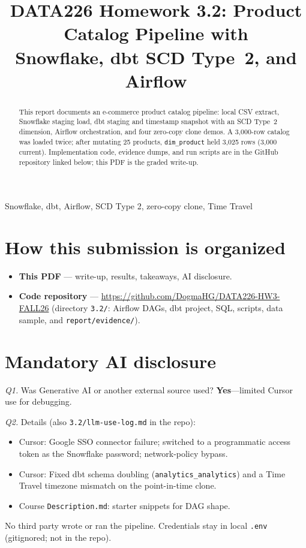 \documentclass[conference]{IEEEtran}
\begin{document}
\title{DATA226 Homework 3.2: Product Catalog Pipeline with\\
Snowflake, dbt SCD Type~2, and Airflow}

\author{
}

\maketitle

\begin{abstract}
This report documents an e-commerce product catalog pipeline:
local CSV extract, Snowflake staging load, dbt staging and timestamp
snapshot with an SCD Type~2 dimension, Airflow orchestration, and four
zero-copy clone demos. A 3{,}000-row catalog was loaded twice; after
mutating 25 products, \texttt{dim\_product} held 3{,}025 rows
(3{,}000 current). Implementation code, evidence dumps, and run scripts
are in the GitHub repository linked below; this PDF is the graded write-up.
\end{abstract}

\begin{IEEEkeywords}
Snowflake, dbt, Airflow, SCD Type 2, zero-copy clone, Time Travel
\end{IEEEkeywords}

\section{How this submission is organized}
\begin{itemize}[leftmargin=*,itemsep=1pt]
  \item \textbf{This PDF} --- write-up, results, takeaways, AI disclosure.
  \item \textbf{Code repository} ---
        \url{https://github.com/DogmaHG/DATA226-HW3-FALL26}
        (directory \texttt{3.2/}: Airflow DAGs, dbt project, SQL, scripts,
        data sample, and \texttt{report/evidence/}).
\end{itemize}

\section{Mandatory AI disclosure}
\textit{Q1.} Was Generative AI or another external source used?
\textbf{Yes}---limited Cursor use for debugging.

\textit{Q2.} Details (also \texttt{3.2/llm-use-log.md} in the repo):
\begin{itemize}[leftmargin=*,itemsep=0pt]
  \item Cursor: Google SSO connector failure; switched to a programmatic
        access token as the Snowflake password; network-policy bypass.
  \item Cursor: Fixed dbt schema doubling (\texttt{analytics\_analytics})
        and a Time Travel timezone mismatch on the point-in-time clone.
  \item Course \texttt{Description.md}: starter snippets for DAG shape.
\end{itemize}
No third party wrote or ran the pipeline. Credentials stay in local
\texttt{.env} (gitignored; not in the repo).
\end{document}

